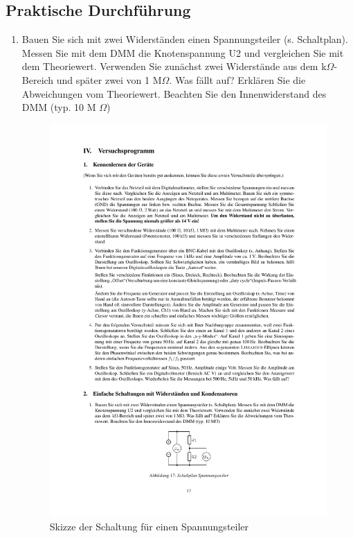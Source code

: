 \documentclass[12pt]{scrartcl}
\begin{document}
\subsection{Praktische Durchführung} 
\begin{enumerate}
\item
Bauen Sie sich mit zwei Widerständen einen Spannungsteiler (s. Schaltplan). Messen Sie mit dem DMM die Knotenspannung U2 und vergleichen Sie mit dem Theoriewert. Verwenden Sie zunächst zwei Widerstände aus dem k$\Omega$-Bereich und später zwei von 1 M$\Omega$. Was fällt auf? Erklären Sie die Abweichungen vom Theoriewert. Beachten Sie den Innenwiderstand des DMM (typ. 10 M
$\Omega$)
\begin{figure}[htbp] 
  \centering
    \includegraphics[trim = 30mm 35mm 1mm 228mm, clip, scale = 1]{spannungsteiler.pdf}
  	\caption[Skizze der Schaltung für einen Spannungsteiler]{Skizze der Schaltung für einen Spannungsteiler\footnotemark}
  \label{fig:spannungsteiler}
\end{figure}


\end{enumerate}
\end{document}
